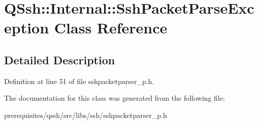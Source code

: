 \hypertarget{class_q_ssh_1_1_internal_1_1_ssh_packet_parse_exception}{}\section{Q\+Ssh\+:\+:Internal\+:\+:Ssh\+Packet\+Parse\+Exception Class Reference}
\label{class_q_ssh_1_1_internal_1_1_ssh_packet_parse_exception}


\subsection{Detailed Description}


Definition at line 51 of file sshpacketparser\+\_\+p.\+h.



The documentation for this class was generated from the following file\+:\begin{DoxyCompactItemize}
\item 
prerequisites/qssh/src/libs/ssh/sshpacketparser\+\_\+p.\+h\end{DoxyCompactItemize}
